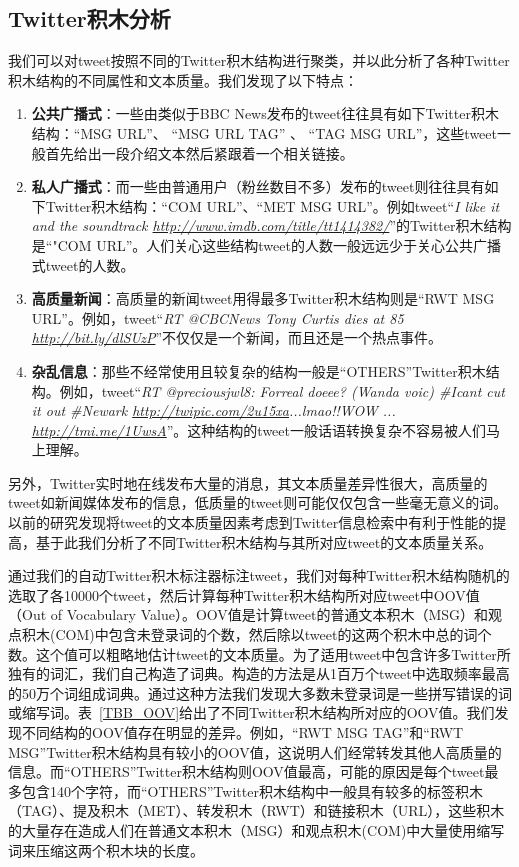 \subsection{Twitter积木分析}
我们可以对tweet按照不同的Twitter积木结构进行聚类，并以此分析了各种Twitter积木结构的不同属性和文本质量。我们发现了以下特点：
  \begin{enumerate}
  \item {\bf 公共广播式}：一些由类似于BBC News发布的tweet往往具有如下Twitter积木结构：“MSG URL”、 “MSG URL TAG” 、 “TAG MSG URL”，这些tweet一般首先给出一段介绍文本然后紧跟着一个相关链接。
  \item {\bf 私人广播式}：而一些由普通用户（粉丝数目不多）发布的tweet则往往具有如下Twitter积木结构：“COM URL”、“MET MSG URL”。例如tweet“\emph{I like it and the soundtrack \url{http://www.imdb.com/title/tt1414382/}}”的Twitter积木结构是“"COM URL”。人们关心这些结构tweet的人数一般远远少于关心公共广播式tweet的人数。
 \item {\bf 高质量新闻}：高质量的新闻tweet用得最多Twitter积木结构则是“RWT MSG URL”。例如，tweet“\emph{RT @CBCNews Tony Curtis dies at 85 \url{http://bit.ly/dlSUzP}}”不仅仅是一个新闻，而且还是一个热点事件。
 \item {\bf 杂乱信息}：那些不经常使用且较复杂的结构一般是“OTHERS”Twitter积木结构。例如，tweet“\emph{RT @preciousjwl8: Forreal doeee? (Wanda voic) \#Icant cut it out \#Newark \url{http://twipic.com/2u15xa}...lmao!!WOW ... \url{http://tmi.me/1UwsA}}”。这种结构的tweet一般话语转换复杂不容易被人们马上理解。
\end{enumerate}   

另外，Twitter实时地在线发布大量的消息，其文本质量差异性很大，高质量的tweet如新闻媒体发布的信息，低质量的tweet则可能仅仅包含一些毫无意义的词。以前的研究发现将tweet的文本质量因素考虑到Twitter信息检索中有利于性能的提高，基于此我们分析了不同Twitter积木结构与其所对应tweet的文本质量关系。

通过我们的自动Twitter积木标注器标注tweet，我们对每种Twitter积木结构随机的选取了各10000个tweet，然后计算每种Twitter积木结构所对应tweet中OOV值（Out of Vocabulary Value）。OOV值是计算tweet的普通文本积木（MSG）和观点积木(COM)中包含未登录词的个数，然后除以tweet的这两个积木中总的词个数。这个值可以粗略地估计tweet的文本质量。为了适用tweet中包含许多Twitter所独有的词汇，我们自己构造了词典。构造的方法是从1百万个tweet中选取频率最高的50万个词组成词典。通过这种方法我们发现大多数未登录词是一些拼写错误的词或缩写词。表~\ref{TBB_OOV}给出了不同Twitter积木结构所对应的OOV值。我们发现不同结构的OOV值存在明显的差异。例如，“RWT MSG TAG”和“RWT MSG”Twitter积木结构具有较小的OOV值，这说明人们经常转发其他人高质量的信息。而“OTHERS”Twitter积木结构则OOV值最高，可能的原因是每个tweet最多包含140个字符，而“OTHERS”Twitter积木结构中一般具有较多的标签积木（TAG）、提及积木（MET）、转发积木（RWT）和链接积木（URL），这些积木的大量存在造成人们在普通文本积木（MSG）和观点积木(COM)中大量使用缩写词来压缩这两个积木块的长度。

